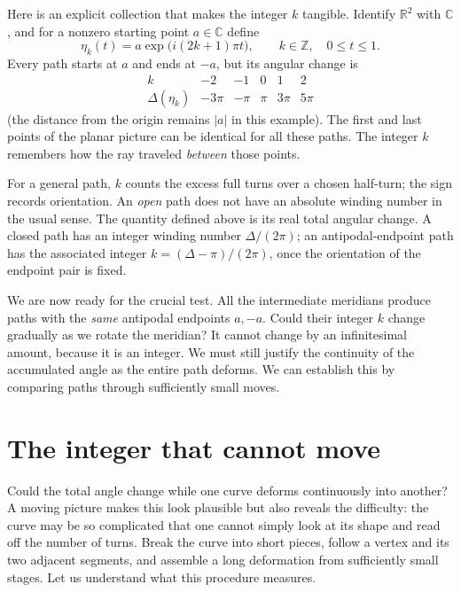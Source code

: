 Here is an explicit collection that makes the integer \(k\) tangible. Identify \(\mathbb R^2\) with \(\mathbb C\), and for a nonzero starting point \(a\in\mathbb C\) define
\[
 \eta_k(t)=a\exp\bigl(i(2k+1)\pi t\bigr),
 \qquad k\in\mathbb Z,\quad 0\leq t\leq1.
\]
Every path starts at \(a\) and ends at \(-a\), but its angular change is
\[
 \begin{array}{c|ccccc}
 k&-2&-1&0&1&2\\ \hline
 \Delta(\eta_k)&-3\pi&-\pi&\pi&3\pi&5\pi
 \end{array}
\]
(the distance from the origin remains \(|a|\) in this example). The first and last points of the planar picture can be identical for all these paths. The integer \(k\) remembers how the ray traveled \emph{between} those points.

For a general path, \(k\) counts the excess full turns over a chosen half-turn; the sign records orientation. An \emph{open} path does not have an absolute winding number in the usual sense. The quantity defined above is its real total angular change. A closed path has an integer winding number \(\Delta/(2\pi)\); an antipodal-endpoint path has the associated integer \(k=(\Delta-\pi)/(2\pi)\), once the orientation of the endpoint pair is fixed.

We are now ready for the crucial test. All the intermediate meridians produce paths with the \emph{same} antipodal endpoints \(a,-a\). Could their integer \(k\) change gradually as we rotate the meridian? It cannot change by an infinitesimal amount, because it is an integer. We must still justify the continuity of the accumulated angle as the entire path deforms. We can establish this by comparing paths through sufficiently small moves.

\section{The integer that cannot move}

Could the total angle change while one curve deforms continuously into another? A moving picture makes this look plausible but also reveals the difficulty: the curve may be so complicated that one cannot simply look at its shape and read off the number of turns. Break the curve into short pieces, follow a vertex and its two adjacent segments, and assemble a long deformation from sufficiently small stages. Let us understand what this procedure measures.

